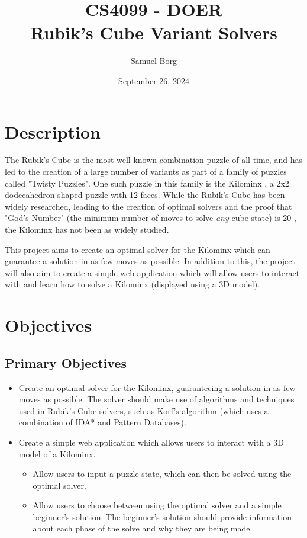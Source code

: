 \documentclass[12pt]{article}
\title{CS4099 - DOER\\Rubik's Cube Variant Solvers}
\author{Samuel Borg}
\date{September 26, 2024}
\begin{document}
\maketitle

\section{Description}
The Rubik's Cube \cite{rubikscube} is the most well-known combination puzzle of all time, and has led to the creation of a large number of variants as part of a family of puzzles called "Twisty Puzzles". One such puzzle in this family is the Kilominx \cite{kilominx}, a 2x2 dodecahedron shaped puzzle with 12 faces. While the Rubik's Cube has been widely researched, leading to the creation of optimal solvers and the proof that "God's Number" (the minimum number of moves to solve \textit{any} cube state) is 20 \cite{godsnumber}, the Kilominx has not been as widely studied.

This project aims to create an optimal solver for the Kilominx which can guarantee a solution in as few moves as possible. In addition to this, the project will also aim to create a simple web application which will allow users to interact with and learn how to solve a Kilominx (displayed using a 3D model).

\section{Objectives}
\subsection{Primary Objectives}
\begin{itemize}
    \item Create an optimal solver for the Kilominx, guaranteeing a solution in as few moves as possible. The solver should make use of algorithms and techniques used in Rubik's Cube solvers, such as Korf's algorithm \cite{korf} (which uses a combination of IDA* and Pattern Databases).
    \item Create a simple web application which allows users to interact with a 3D model \cite{3dmodel} of a Kilominx.
    \begin{itemize}
        \item Allow users to input a puzzle state, which can then be solved using the optimal solver.
        \item Allow users to choose between using the optimal solver and a simple beginner's solution. The beginner's solution should provide information about each phase of the solve and why they are being made.
    \end{itemize}
\end{itemize}
\end{document}
